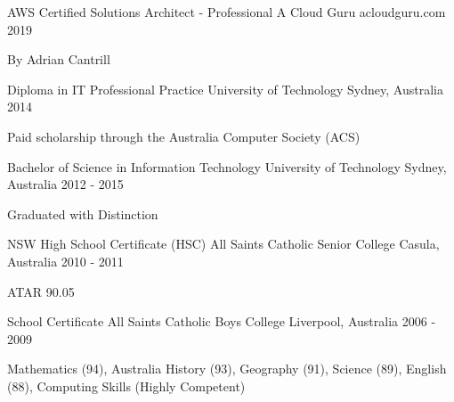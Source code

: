 

\begin{cventries}

  \cventry
  {AWS Certified Solutions Architect - Professional} %
  {A Cloud Guru} %
  {acloudguru.com} %
  {2019} %
  {
    \begin{cvitems} %
      \item {By Adrian Cantrill}
    \end{cvitems}
  }

  \cventry
  {Diploma in IT Professional Practice} %
  {University of Technology} %
  {Sydney, Australia} %
  {2014} %
  {
    \begin{cvitems} %
      \item {Paid scholarship through the Australia Computer Society (ACS)}
    \end{cvitems}
  }


  \cventry
  {Bachelor of Science in Information Technology} %
  {University of Technology} %
  {Sydney, Australia} %
  {2012 - 2015} %
  {
    \begin{cvitems} %
      \item {Graduated with Distinction}
    \end{cvitems}
  }

  \cventry
  {NSW High School Certificate (HSC)} %
  {All Saints Catholic Senior College} %
  {Casula, Australia} %
  {2010 - 2011} %
  {
    \begin{cvitems} %
      \item {ATAR 90.05}
    \end{cvitems}
  }

  \cventry
  {School Certificate} %
  {All Saints Catholic Boys College} %
  {Liverpool, Australia} %
  {2006 - 2009} %
  {
    \begin{cvitems} %
      \item {Mathematics (94), Australia History (93), Geography (91), Science (89), English (88), Computing Skills (Highly Competent)}
    \end{cvitems}
  }


\end{cventries}
